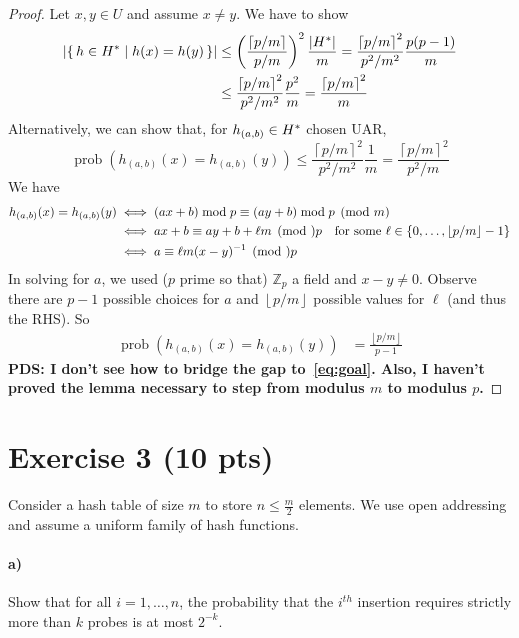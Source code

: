 \documentclass[a4paper]{article}
\DeclareMathOperator{\prob}{prob}
\newcommand*{\floor}[1]{\left\lfloor{#1}\right\rfloor}
\newcommand*{\ceil}[1]{\left\lceil{#1}\right\rceil}
\newcommand{\ZZ}{\mathbb{Z}}
\newcommand*{\dave}[1]{{\color{red}\textbf{PDS: #1}}}
\begin{document}
\begin{proof}
	\newcommand{\hh}{h_{(a,b)}}%
	Let $x, y \in U$ and assume $x \not= y$.
	We have to show
	\begin{align*}
		|\set{\,h \in \HH \mid h(x) = h(y)\,}| &\le \left(\frac{\ceil{p/m}}{p/m}\right)^2 \frac{|\HH|}{m} = \frac{\ceil{p/m}^2}{p^2/m^2} \frac{p(p-1)}{m} \\
			&\le \frac{\ceil{p/m}^2}{p^2/m^2} \frac{p^2}{m} = \frac{\ceil{p/m}^2}{m}
	\end{align*}
	Alternatively, we can show that, for $\hh\in\HH$ chosen UAR,
	\begin{equation}\label{eq:goal}
		\prob(\hh(x) = \hh(y))\le \frac{\ceil{p/m}^2}{p^2/m^2}\frac{1}{m} = \frac{\ceil{p/m}^2}{p^2/m}
	\end{equation}
	We have
	\begin{align*}
		\hh(x) = \hh(y) &\iff \mathrlap{(ax+b) \bmod p \equiv (ay+b) \bmod p \pmod m} \\
			&\iff ax+b \equiv ay+b+\ell m \pmod p	&\text{for some $\ell \in \set{0, \ldots, \floor{p/m}-1}$} \\
			&\iff a \equiv \ell m(x-y)^{-1} \pmod p
	\end{align*}
	In solving for $a$, we used ($p$ prime so that) $\ZZ_p$ a field and $x - y \not= 0$.
	Observe there are $p-1$ possible choices for $a$ and $\floor{p/m}$ possible values for $\ell$ (and thus the RHS).
	So
	\begin{align*}
		\prob(\hh(x) = \hh(y)) &= \frac{\floor{p/m}}{p-1}
	\end{align*}
	\dave{I don't see how to bridge the gap to~\eqref{eq:goal}.
		Also, I haven't proved the lemma necessary to step from modulus $m$ to modulus $p$.}
\end{proof}


\section{Exercise 3 (10 pts)}

\noindent Consider a hash table of size $m$ to store $n \le  \frac{m}{2}$ elements. We use open addressing and assume a uniform family of hash functions.

\paragraph{a)} Show that for all $i = 1, \ldots, n$, the probability that the $i^{th}$ insertion requires strictly more than $k$ probes is at most $2^{-k}$.
\end{document}
